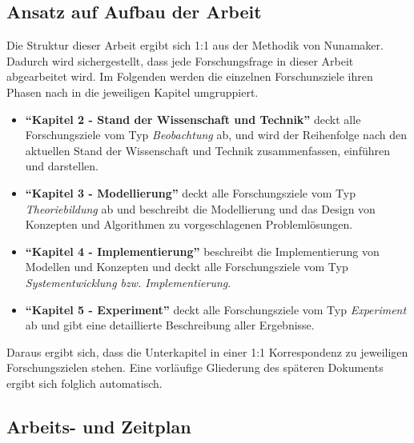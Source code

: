 \subsection{Ansatz auf Aufbau der Arbeit}
\label{sec1:intro:subsec:approach-structure}
Die Struktur dieser Arbeit ergibt sich 1:1 aus der Methodik von Nunamaker. Dadurch wird sichergestellt, dass jede Forschungsfrage in dieser Arbeit abgearbeitet wird. Im Folgenden werden die einzelnen Forschunsziele ihren Phasen nach in die jeweiligen Kapitel umgruppiert.
\begin{itemize}
    \setlength{\itemsep}{0pt}
    \item \textbf{\enquote{Kapitel 2 - Stand der Wissenschaft und Technik}} deckt alle Forschungsziele vom Typ \textit{Beobachtung} ab, und wird der Reihenfolge nach den aktuellen Stand der Wissenschaft und Technik zusammenfassen, einführen und darstellen.
    \item \textbf{\enquote{Kapitel 3 - Modellierung}} deckt alle Forschungsziele vom Typ \textit{Theoriebildung} ab und beschreibt die Modellierung und das Design von Konzepten und Algorithmen zu vorgeschlagenen Problemlösungen.
    \item \textbf{\enquote{Kapitel 4 - Implementierung}} beschreibt die Implementierung von Modellen und Konzepten und deckt alle Forschungsziele vom Typ \textit{Systementwicklung bzw. Implementierung}.
    \item \textbf{\enquote{Kapitel 5 - Experiment}} deckt alle Forschungsziele vom Typ \textit{Experiment} ab und gibt eine detaillierte Beschreibung aller Ergebnisse.
\end{itemize}
Daraus ergibt sich, dass die Unterkapitel in einer 1:1 Korrespondenz zu jeweiligen Forschungszielen stehen. Eine vorläufige Gliederung des späteren Dokuments ergibt sich folglich automatisch.

\subsection{Arbeits- und Zeitplan}
\label{sec1:intro:subsec:work-time-plan}